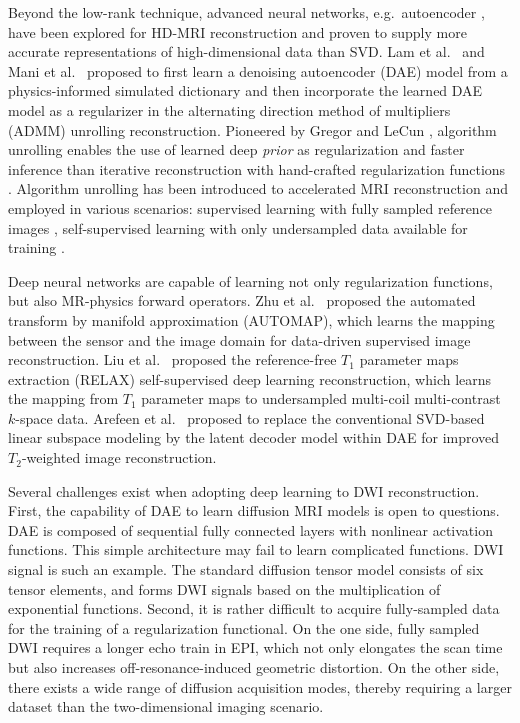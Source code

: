 \documentclass[journal,twoside,web]{ieeecolor}
\begin{document}
	Beyond the low-rank technique,
	advanced neural networks, e.g.~autoencoder \cite{hinton_2006_ae},
	have been explored for HD-MRI reconstruction and
	proven to supply more accurate representations of
	high-dimensional data than SVD.
	Lam et al.~\cite{lam_2019_mrsi} and Mani et al.~\cite{mani_2021_qmodel}
	proposed to first learn a denoising autoencoder (DAE) model
	from a physics-informed simulated dictionary
	and then incorporate the learned DAE model as a regularizer
	in the alternating direction method of multipliers (ADMM)
	\cite{boyd_2010_admm}
	unrolling reconstruction.
	Pioneered by Gregor and LeCun \cite{gregor_2010_algunroll},
	algorithm unrolling enables the use of learned deep \textit{prior}
	as regularization and faster inference than
	iterative reconstruction with hand-crafted regularization functions
	\cite{monga_2021_algunroll}.
	Algorithm unrolling has been introduced to
	accelerated MRI reconstruction and
	employed in various scenarios:
	supervised learning with fully sampled reference images
	\cite{hammernik_2018_varnet,aggarwal_2018_modl},
	self-supervised learning
	with only undersampled data available for training
	\cite{yaman_2020_ssdu,yaman_2022_zs}.

	Deep neural networks are capable of learning
	not only regularization functions,
	but also MR-physics forward operators.
	Zhu et al.~\cite{zhu_2018_automap} proposed
	the automated transform by manifold approximation (AUTOMAP),
	which learns the mapping between the sensor and the image domain
	for data-driven supervised image reconstruction.
	Liu et al.~\cite{liu_2021_relax} proposed
	the reference-free $T_1$ parameter maps extraction (RELAX)
	self-supervised deep learning reconstruction,
	which learns the mapping from $T_1$ parameter maps to
	undersampled multi-coil multi-contrast $k$-space data.
	Arefeen et al.~\cite{arefeen_2023_latent} proposed
	to replace the conventional SVD-based linear subspace modeling
	\cite{huang_2012_t2basis}
	by the latent decoder model within DAE
	for improved $T_2$-weighted image reconstruction.

	Several challenges exist when adopting deep learning to
	DWI reconstruction.
	First, the capability of DAE to learn diffusion MRI models
	is open to questions.
	DAE is composed of sequential fully connected layers
	with nonlinear activation functions.
	This simple architecture may fail to learn complicated functions.
	DWI signal is such an example.
	The standard diffusion tensor model \cite{basser_1994_dmri}
	consists of six tensor elements,
	and forms DWI signals based on
	the multiplication of exponential functions.
	Second, it is rather difficult to acquire fully-sampled data
	for the training of a regularization functional.
	On the one side,
	fully sampled DWI requires a longer echo train in EPI,
	which not only elongates the scan time
	but also increases off-resonance-induced geometric distortion.
	On the other side,
	there exists a wide range of diffusion acquisition modes,
	thereby requiring a larger dataset than
	the two-dimensional imaging scenario.
\end{document}
